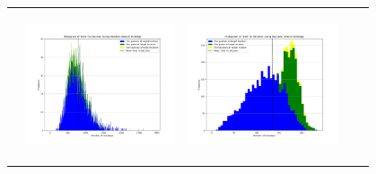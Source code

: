 \begin{landscape}
\begin{table}[h!]
\begin{tabular}{ | c | c | c | c | c |}
\begin{minipage}[c][45mm][c]{45mm}
    \end{minipage}
    &
    \begin{minipage}[c][45mm][c]{45mm}
      \includegraphics[width=44mm, height=44mm]{Chapters/MultiAgentTargetDetection/Figs/Histograms/MultipleAgent/2/2RandomHistogram.png}
    \end{minipage}
    &
    \begin{minipage}[c][45mm][c]{45mm}
      \includegraphics[width=44mm, height=44mm]{Chapters/MultiAgentTargetDetection/Figs/Histograms/MultipleAgent/2/2SaccadicHistogram.png}
    \end{minipage}
    \\


\end{tabular}
\end{table}
\end{landscape}
